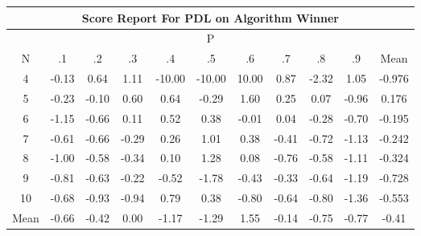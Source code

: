 \documentclass[11pt,a4paper]{report}
\begin{document}
\begin{longtable}{ | c || c | c | c | c | c | c | c | c | c || c |}
\hline
\multicolumn{11}{|c|}{ Score Report For PDL on Algorithm Winner} \\
\hline
\multicolumn{11}{|c|}{ P } \\
\hline
N & .1 & .2 & .3 & .4 & .5 & .6 & .7 & .8 & .9 & Mean\\
 \hline
 \hline
 \endhead
  4 &  \cellcolor[HTML]{FFFFFF} -0.13 &  \cellcolor[HTML]{EFEFFF} 0.64 &  \cellcolor[HTML]{E7E7FF} 1.11 &  \cellcolor[HTML]{FF0000} -10.00 &  \cellcolor[HTML]{FF0000} -10.00 &  \cellcolor[HTML]{0808FF} 10.00 &  \cellcolor[HTML]{E7E7FF} 0.87 &  \cellcolor[HTML]{FFC7C7} -2.32 &  \cellcolor[HTML]{E7E7FF} 1.05 & -0.976 \\
  5 &  \cellcolor[HTML]{FFF7F7} -0.23 &  \cellcolor[HTML]{FFFFFF} -0.10 &  \cellcolor[HTML]{EFEFFF} 0.60 &  \cellcolor[HTML]{EFEFFF} 0.64 &  \cellcolor[HTML]{FFF7F7} -0.29 &  \cellcolor[HTML]{D7D7FF} 1.60 &  \cellcolor[HTML]{F7F7FF} 0.25 &  \cellcolor[HTML]{FFFFFF} 0.07 &  \cellcolor[HTML]{FFE7E7} -0.96 & 0.176 \\
  6 &  \cellcolor[HTML]{FFDFDF} -1.15 &  \cellcolor[HTML]{FFEFEF} -0.66 &  \cellcolor[HTML]{FFFFFF} 0.11 &  \cellcolor[HTML]{EFEFFF} 0.52 &  \cellcolor[HTML]{F7F7FF} 0.38 &  \cellcolor[HTML]{FFFFFF} -0.01 &  \cellcolor[HTML]{FFFFFF} 0.04 &  \cellcolor[HTML]{FFF7F7} -0.28 &  \cellcolor[HTML]{FFEFEF} -0.70 & -0.195 \\
  7 &  \cellcolor[HTML]{FFEFEF} -0.61 &  \cellcolor[HTML]{FFEFEF} -0.66 &  \cellcolor[HTML]{FFF7F7} -0.29 &  \cellcolor[HTML]{F7F7FF} 0.26 &  \cellcolor[HTML]{E7E7FF} 1.01 &  \cellcolor[HTML]{F7F7FF} 0.38 &  \cellcolor[HTML]{FFF7F7} -0.41 &  \cellcolor[HTML]{FFEFEF} -0.72 &  \cellcolor[HTML]{FFDFDF} -1.13 & -0.242 \\
  8 &  \cellcolor[HTML]{FFE7E7} -1.00 &  \cellcolor[HTML]{FFEFEF} -0.58 &  \cellcolor[HTML]{FFF7F7} -0.34 &  \cellcolor[HTML]{FFFFFF} 0.10 &  \cellcolor[HTML]{DFDFFF} 1.28 &  \cellcolor[HTML]{FFFFFF} 0.08 &  \cellcolor[HTML]{FFEFEF} -0.76 &  \cellcolor[HTML]{FFEFEF} -0.58 &  \cellcolor[HTML]{FFE7E7} -1.11 & -0.324 \\
  9 &  \cellcolor[HTML]{FFE7E7} -0.81 &  \cellcolor[HTML]{FFEFEF} -0.63 &  \cellcolor[HTML]{FFF7F7} -0.22 &  \cellcolor[HTML]{FFEFEF} -0.52 &  \cellcolor[HTML]{FFCFCF} -1.78 &  \cellcolor[HTML]{FFF7F7} -0.43 &  \cellcolor[HTML]{FFF7F7} -0.33 &  \cellcolor[HTML]{FFEFEF} -0.64 &  \cellcolor[HTML]{FFDFDF} -1.19 & -0.728 \\
  10 &  \cellcolor[HTML]{FFEFEF} -0.68 &  \cellcolor[HTML]{FFE7E7} -0.93 &  \cellcolor[HTML]{FFE7E7} -0.94 &  \cellcolor[HTML]{EFEFFF} 0.79 &  \cellcolor[HTML]{F7F7FF} 0.38 &  \cellcolor[HTML]{FFE7E7} -0.80 &  \cellcolor[HTML]{FFEFEF} -0.64 &  \cellcolor[HTML]{FFE7E7} -0.80 &  \cellcolor[HTML]{FFDFDF} -1.36 & -0.553 \\
 \hline
 \hline
Mean &  \cellcolor[HTML]{FFEFEF} -0.66 &  \cellcolor[HTML]{FFF7F7} -0.42 &  \cellcolor[HTML]{FFFFFF} 0.00 &  \cellcolor[HTML]{FFDFDF} -1.17 &  \cellcolor[HTML]{FFDFDF} -1.29 &  \cellcolor[HTML]{D7D7FF} 1.55 &  \cellcolor[HTML]{FFFFFF} -0.14 &  \cellcolor[HTML]{FFEFEF} -0.75 &  \cellcolor[HTML]{FFEFEF} -0.77 &  \cellcolor[HTML]{FFF7F7} -0.41
\end{longtable}
\end{document}

